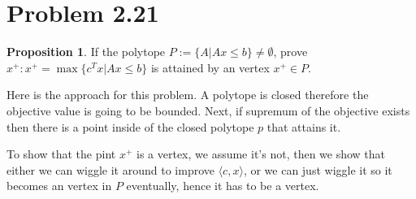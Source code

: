 \documentclass[]{article}
\theoremstyle{definition}
\newtheorem{prop}{Proposition}[section]  %
\begin{document}
\section{Problem 2.21}
    \begin{prop}
        If the polytope $P:= \{A| Ax \le b\}\neq \emptyset$, prove $x^+: x^+ = \max \{c^Tx | Ax \le b\}$ is attained by an vertex $x^+\in P$. 
    \end{prop}
    \par
    Here is the approach for this problem. A polytope is closed therefore the objective value is going to be bounded. Next, if supremum of the objective exists then there is a point inside of the closed polytope $p$ that attains it. 
    \par
    To show that the pint $x^+$ is a vertex, we assume it's not, then we show that either we can wiggle it around to improve $\langle c, x\rangle$, or we can just wiggle it so it becomes an vertex in $P$ eventually, hence it has to be a vertex. 
\end{document}
